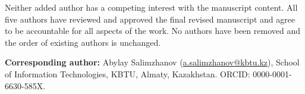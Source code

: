 \documentclass[11pt]{article}
\begin{document}
Neither added author has a competing interest with the manuscript content.
All five authors have reviewed and approved the final revised manuscript and agree to
be accountable for all aspects of the work.
No authors have been removed and the order of existing authors is unchanged.

\bigskip

\noindent\textbf{Corresponding author:} Abylay Salimzhanov
(\href{mailto:a.salimzhanov@kbtu.kz}{a.salimzhanov@kbtu.kz}),
School of Information Technologies, KBTU, Almaty, Kazakhstan.
ORCID: 0000-0001-6630-585X.
\end{document}
